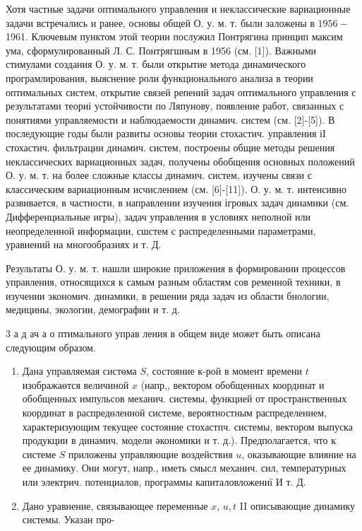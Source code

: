 \documentclass[10pt]{article}
\begin{document}
Хотя частные задачи оптимального управления и неклассические вариационные задачи встречались и ранее, основы общей О. у. м. т. были заложены в $1956-$ 1961. Ключевым пунктом этой теории послужил Понтрягина принцип максим ума, сформулированный Л. С. Понтрягшным в 1956 (см. [1]). Важными стимулами создания О. у. м. т. были открытие метода динамического програмлирования, выяснение роли функционального анализа в теории оптимальных систем, открытие связей репений задач оптимального управления с результатами теориі устойчивости по Ляпунову, появление работ, связанных с понятиями управляемости и наблюдаемости динамич. систем (см. [2]-[5]). В последующие годы были развиты основы теории стохастич. управления іІ стохастич. фильтрации динамич. систем, построены общие методы решения неклассических вариационных задач, получены обобщения основных положений О. у. м. т. на более сложные классы динамич. систем, изучены связи с классическим вариационным исчислением (см. [6]-[11]). О. у. м. т. интенсивно развивается, в частности, в направлении изучения ігровых задач динамики (см. Дифференциальные игры), задач управления в условиях неполной или неопределенной информации, сшстем с распределенными параметрами, уравнений на многообразиях и т. Д.



Результаты О. у. м. т. нашли широкие приложения в формировании процессов управления, относящихся к самым разным областям сов ременной техники, в изучении экономич. динамики, в решении ряда задач из области бнологии, медицины, экологии, демографии и т. д.



3 а д ач а о птимального управ ления в общем виде может быть описана следующим образом.



\begin{enumerate}

  \item Дана управляемая систөма $S$, состояние к-рой в момент времени $t$ изображаөтся величиной $x$ (напр,, вектором обобщенных координат и обобщенных импульсов механич. системы, функцией от пространственных координат в распредөленной системе, вероятностным распределением, характеризующим текущее состояние стохастпч. системы, вектором выпуска продукции в динамич. модели әкономики и т. д.). Предполагается, что к системе $S$ приложены управляющие воздействия $u$, оказывающие влияние на ее динамику. Они могут, напр., иметь смысл механич. сил, температурных или электрич. потенциалов, программы капиталовложениї И т. Д.



  \item Дано уравнение, связывающее переменные $x$, $u, t$ II описывающие динамику системы. Указан про-



\end{enumerate}
\end{document}
